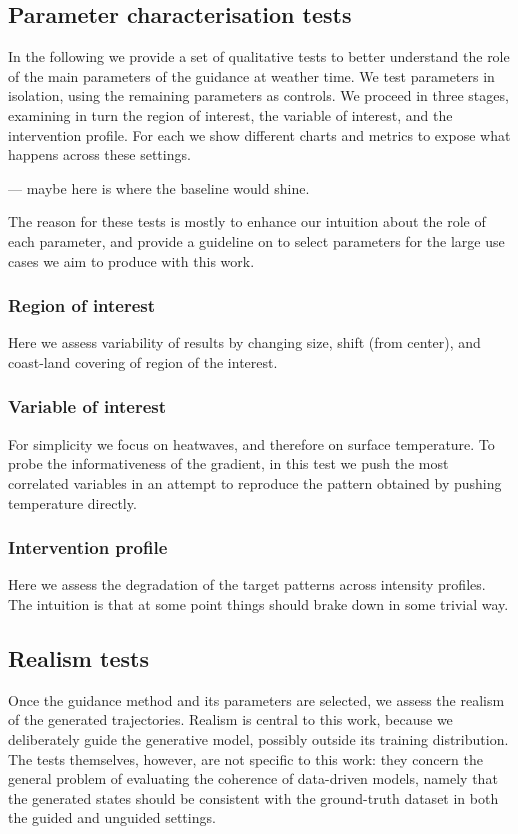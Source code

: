 \subsection{Parameter characterisation tests}

In the following we provide a set of qualitative tests to better understand the role of the main parameters of the guidance at weather time.
We test parameters in isolation, using the remaining parameters as controls. We proceed in three stages, examining in turn the region of interest, the variable of interest, and the intervention profile.
For each we show different charts and metrics to expose what happens across these settings.

--- maybe here is where the baseline would shine.

The reason for these tests is mostly to enhance our intuition about the role of each parameter, and provide a guideline on to select parameters for the large use cases we aim to produce with this work.

\subsubsection{Region of interest}
Here we assess variability of results by changing size, shift (from center), and coast-land covering of region of the interest.

\subsubsection{Variable of interest}
For simplicity we focus on heatwaves, and therefore on surface temperature. 
To probe the informativeness of the gradient, in this test we push the most correlated variables in an attempt to reproduce the pattern obtained by pushing temperature directly. 

\subsubsection{Intervention profile}
Here we assess the degradation of the target patterns across intensity profiles.
The intuition is that at some point things should brake down in some trivial way. 

\subsection{Realism tests}

Once the guidance method and its parameters are selected, we assess the realism of the generated trajectories. Realism is central to this work, because we deliberately guide the generative model, possibly outside its training distribution. The tests themselves, however, are not specific to this work: they concern the general problem of evaluating the coherence of data-driven models, namely that the generated states should be consistent with the ground-truth dataset in both the guided and unguided settings.

